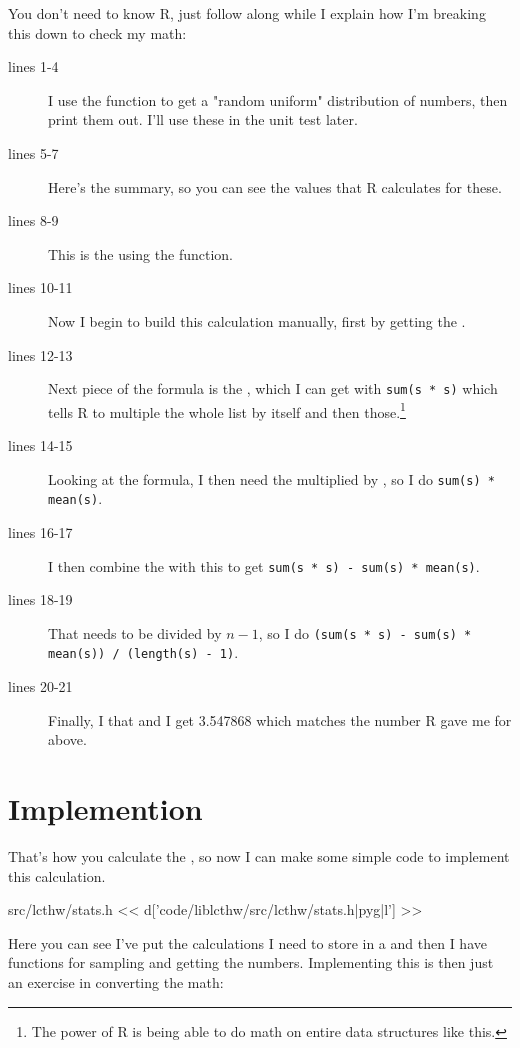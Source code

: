 You don't need to know R, just follow along while I explain how I'm breaking this
down to check my math:

\begin{description}
\item[lines 1-4] I use the function  to get a "random uniform" distribution
    of numbers, then print them out.  I'll use these in the unit test later.
\item[lines 5-7] Here's the summary, so you can see the values that R calculates for these.
\item[lines 8-9] This is the  using the  function.
\item[lines 10-11] Now I begin to build this calculation manually, first by getting the
    .
\item[lines 12-13] Next piece of the  formula is the , which I
    can get with \verb|sum(s * s)| which tells R to multiple the whole 
    list by itself and then  those.\footnote{The power of R is being able to 
    do math on entire data structures like this.}
\item[lines 14-15] Looking at the formula, I then need the  multiplied by , so I do \verb|sum(s) * mean(s)|.
\item[lines 16-17] I then combine the  with this to get \verb|sum(s * s) - sum(s) * mean(s)|.
\item[lines 18-19] That needs to be divided by $n-1$, so I do \verb|(sum(s * s) - sum(s) * mean(s)) / (length(s) - 1)|.
\item[lines 20-21] Finally, I  that and I get 3.547868 which matches
    the number R gave me for  above.
\end{description}

\section{Implemention}

That's how you calculate the , so now I can make some simple code
to implement this calculation.

\begin{code}{src/lcthw/stats.h}
<< d['code/liblcthw/src/lcthw/stats.h|pyg|l'] >>
\end{code}

Here you can see I've put the calculations I need to store in a 
and then I have functions for sampling and getting the numbers.  Implementing
this is then just an exercise in converting the math:

